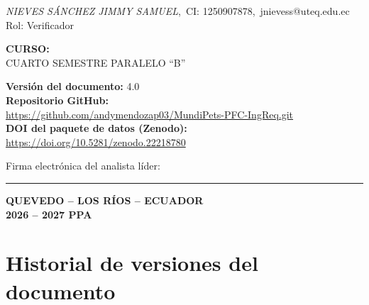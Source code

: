 \documentclass[journal,onecolumn]{IEEEtran}
\begin{document}
\begin{titlepage}
		\textit{NIEVES SÁNCHEZ JIMMY SAMUEL},~CI: 1250907878,~jnievess@uteq.edu.ec\\
		{\small Rol: Verificador}
		
		\vspace{0.2cm}
		
		{\normalsize\bfseries CURSO:}\\[4pt]
		{\normalsize CUARTO SEMESTRE PARALELO \enquote{B}}
		
		\vspace{0.2cm}
		
		{\normalsize\bfseries Versión del documento:} 4.0\\[4pt]
		\textbf{Repositorio GitHub:}\\
		\url{https://github.com/andymendozap03/MundiPets-PFC-IngReq.git}\\[6pt]
		\textbf{DOI del paquete de datos (Zenodo):}\\
		\url{https://doi.org/10.5281/zenodo.22218780}
		
		
		\vspace{1.8cm}
		
		{\small Firma electrónica del analista líder: \rule{5cm}{0.4pt}}
		
		{\normalsize\bfseries QUEVEDO -- LOS RÍOS -- ECUADOR}\\[4pt]
		{\normalsize\bfseries 2026 -- 2027 PPA}
		
	\end{titlepage}
	
	\section*{Historial de versiones del documento}
	
\end{document}
